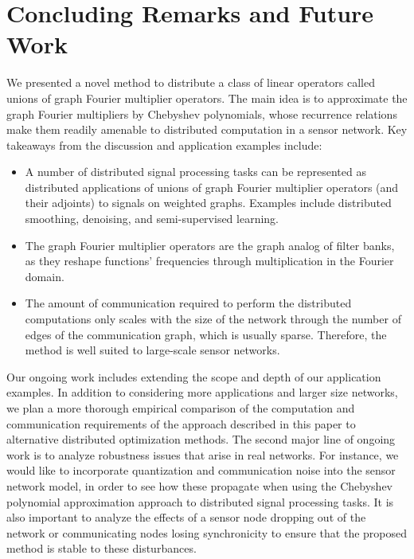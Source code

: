 \documentclass[conference]{IEEEtran}
\begin{document}
\section{Concluding Remarks and Future Work} \label{Se:conclusion}

We presented a novel method to distribute a class of linear operators called unions of graph Fourier multiplier operators. The main idea is to approximate the graph Fourier multipliers by Chebyshev polynomials, whose recurrence relations make them readily amenable to distributed computation in a sensor network. Key takeaways from the discussion and application examples include:
\begin{itemize}
\item A number of distributed signal processing tasks can be represented as distributed applications of unions of graph Fourier multiplier operators (and their adjoints) to signals on weighted graphs. Examples include distributed smoothing, denoising, and semi-supervised learning.
\item The graph Fourier multiplier operators are the graph analog of filter banks, as they reshape functions' frequencies through multiplication in the Fourier domain.
\item The amount of communication required to perform the distributed computations only scales with the size of the network through the number of edges of the communication graph, which is usually sparse. Therefore, the method is well suited to large-scale sensor networks.
\end{itemize}

Our ongoing work includes extending the scope and depth of our application examples. In addition to considering more applications and larger size networks, we plan a more thorough empirical comparison of the computation and communication requirements of the approach described in this paper to alternative distributed optimization methods. The second major line of ongoing work is to analyze robustness issues that arise in real networks. For instance, we would like to incorporate quantization and communication noise into the sensor network model, in order to see how these propagate when using the Chebyshev polynomial approximation approach to distributed signal processing tasks. It is also important to analyze the effects of a sensor node dropping out of the network or communicating nodes losing synchronicity to ensure that the proposed method is stable to these disturbances.

















\end{document}
